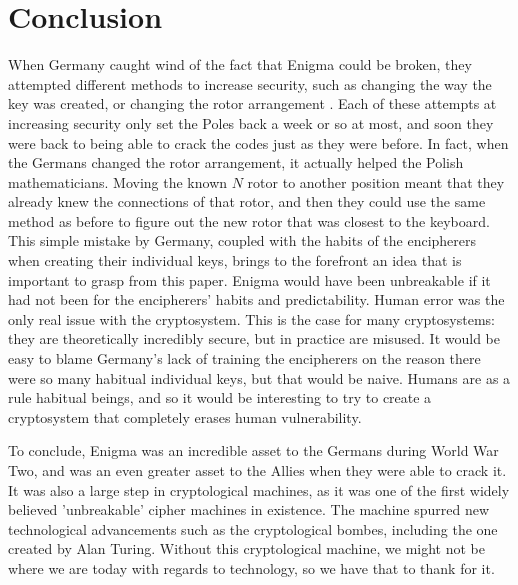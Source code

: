 \chapter{Conclusion}\label{chap:conclusion}

When Germany caught wind of the fact that Enigma could be broken, they attempted different methods to increase security, such as changing the way the key was created, or changing the rotor arrangement \cite{wk85}. Each of these attempts at increasing security only set the Poles back a week or so at most, and soon they were back to being able to crack the codes just as they were before. In fact, when the Germans changed the rotor arrangement, it actually helped the Polish mathematicians. Moving the known $N$ rotor to another position meant that they already knew the connections of that rotor, and then they could use the same method as before to figure out the new rotor that was closest to the keyboard. This simple mistake by Germany, coupled with the habits of the encipherers when creating their individual keys, brings to the forefront an idea that is important to grasp from this paper. Enigma would have been unbreakable if it had not been for the encipherers' habits and predictability. Human error was the only real issue with the cryptosystem. This is the case for many cryptosystems: they are theoretically incredibly secure, but in practice are misused. It would be easy to blame Germany's lack of training the encipherers on the reason there were so many habitual individual keys, but that would be naive. Humans are as a rule habitual beings, and so it would be interesting to try to create a cryptosystem that completely erases human vulnerability.

To conclude, Enigma was an incredible asset to the Germans during World War Two, and was an even greater asset to the Allies when they were able to crack it. It was also a large step in cryptological machines, as it was one of the first widely believed 'unbreakable' cipher machines in existence. The machine spurred new technological advancements such as the cryptological bombes, including the one created by Alan Turing. Without this cryptological machine, we might not be where we are today with regards to technology, so we have that to thank for it.
